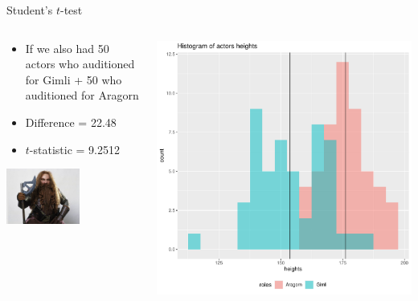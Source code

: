 \documentclass[aspectratio=169]{beamer}\usepackage[]{graphicx}\usepackage[]{color}
\makeatletter
\def\maxwidth{ %
  \ifdim\Gin@nat@width>\linewidth
    \linewidth
  \else
    \Gin@nat@width
  \fi
}
\newenvironment{knitrout}{}{} %
\makeatother
\begin{document}
\begin{frame}[fragile]{Student's $t$-test}

\begin{columns}
  \begin{column}{0.5\textwidth}
  \begin{itemize}
    \item If we also had 50 actors who auditioned for Gimli + 50 who auditioned for Aragorn
    \item Difference = 22.48
    \item $t$-statistic = 9.2512
  \end{itemize}
  \begin{center}
      \includegraphics[width=0.55\textwidth]{./images/Gimli.jpg}
  \end{center}
  \end{column}
  \begin{column}{0.5\textwidth}
\begin{knitrout}\scriptsize
{}\color{fgcolor}
\includegraphics[width=\maxwidth]{figure/unnamed-chunk-26-1} 

\end{knitrout}
  \end{column}
\end{columns}
\end{frame}
\end{document}
